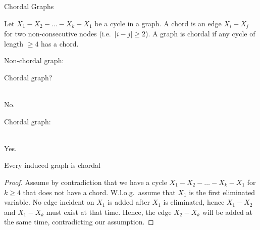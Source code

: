 \begin{frame}{Chordal Graphs}
    \begin{definition}
        Let $X_1 - X_2 - \dots - X_k - X_1$ be a cycle in a graph.
        A chord is an edge $X_i - X_j$ for two non-consecutive nodes (i.e.\ $|i-j| \geq 2$).
        A graph is chordal if any cycle of length $\geq 4$ has a chord.
    \end{definition}
    \pause
\begin{minipage}[t]{0.3\textwidth}
\begin{center}
    Non-chordal graph:
\end{center}
\end{minipage}
\pause
\begin{minipage}[t]{0.3\textwidth}
\begin{center}
    Chordal graph?\\
\\ \pause
No.
\end{center}
\end{minipage}
\pause
\begin{minipage}[t]{0.3\textwidth}
\begin{center}
    Chordal graph:\\
\\ \pause
Yes.
\end{center}
\end{minipage}
    \pause
    \begin{theorem}
        \label{thm:induced-graph-chordal}
    Every induced graph is chordal
    \end{theorem}
    \begin{proof}
        Assume by contradiction that we have a cycle $X_1 - X_2 - \dots - X_k - X_1$ for $k \geq 4$ that does not have a chord.
        \pause
        W.l.o.g.\ assume that $X_1$ is the first eliminated variable.
        No edge incident on $X_1$ is added after $X_1$ is eliminated, hence $X_1 - X_2$ and $X_1 - X_k$ must exist at that time.
        \pause
        Hence, the edge $X_2 - X_k$ will be added at the same time, contradicting our assumption.
    \end{proof}
\end{frame}
    
